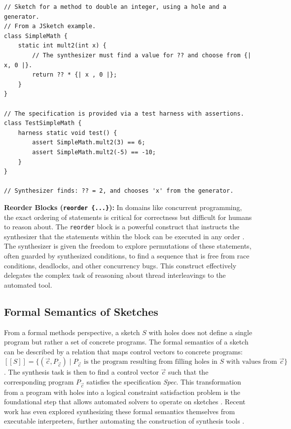 \documentclass[12pt, a4paper]{report}
\begin{document}
\begin{verbatim}
// Sketch for a method to double an integer, using a hole and a generator.
// From a JSketch example.
class SimpleMath {
    static int mult2(int x) {
        // The synthesizer must find a value for ?? and choose from {| x, 0 |}.
        return ?? * {| x , 0 |};
    }
}

// The specification is provided via a test harness with assertions.
class TestSimpleMath {
    harness static void test() {
        assert SimpleMath.mult2(3) == 6;
        assert SimpleMath.mult2(-5) == -10;
    }
}

// Synthesizer finds: ?? = 2, and chooses 'x' from the generator.
\end{verbatim}

\textbf{Reorder Blocks (\texttt{reorder \{...\}}):} In domains like concurrent programming, the exact ordering of statements is critical for correctness but difficult for humans to reason about. The \texttt{reorder} block is a powerful construct that instructs the synthesizer that the statements within the block can be executed in any order \citep{solar2008program}. The synthesizer is given the freedom to explore permutations of these statements, often guarded by synthesized conditions, to find a sequence that is free from race conditions, deadlocks, and other concurrency bugs. This construct effectively delegates the complex task of reasoning about thread interleavings to the automated tool.

\subsection{Formal Semantics of Sketches}
From a formal methods perspective, a sketch $S$ with holes does not define a single program but rather a set of concrete programs. The formal semantics of a sketch can be described by a relation that maps control vectors to concrete programs: $[[S]] = \{(\vec{c}, P_{\vec{c}}) \mid P_{\vec{c}} \text{ is the program resulting from filling holes in } S \text{ with values from } \vec{c}\}$ \citep{solar2008program}. The synthesis task is then to find a control vector $\vec{c}$ such that the corresponding program $P_{\vec{c}}$ satisfies the specification \textit{Spec}. This transformation from a program with holes into a logical constraint satisfaction problem is the foundational step that allows automated solvers to operate on sketches \citep{alur2013syntax}. Recent work has even explored synthesizing these formal semantics themselves from executable interpreters, further automating the construction of synthesis tools \citep{jeo2021synthesizing}.
\end{document}
